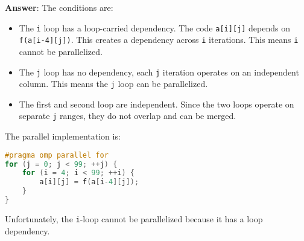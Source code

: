 \begin{enumerate}[label=\Alph*.]
    \textbf{Answer}: The conditions are:
    \begin{itemize}
        \item The \texttt{i} loop has a loop-carried dependency. The code \texttt{a[i][j]} depends on \texttt{f(a[i-4][j])}. This creates a dependency across \texttt{i} iterations. This means \texttt{i} cannot be parallelized.
        \item The \texttt{j} loop has no dependency, each \texttt{j} iteration operates on an independent column. This means the \texttt{j} loop can be parallelized.
        \item The first and second loop are independent. Since the two loops operate on separate \texttt{j} ranges, they do not overlap and can be merged.
    \end{itemize}
    The parallel implementation is:
    \begin{lstlisting}[language=c++]
#pragma omp parallel for
for (j = 0; j < 99; ++j) {
    for (i = 4; i < 99; ++i) {
        a[i][j] = f(a[i-4][j]);
    }
}\end{lstlisting}
    Unfortunately, the \texttt{i}-loop cannot be parallelized because it has a loop dependency.
\end{enumerate}

\newpage


